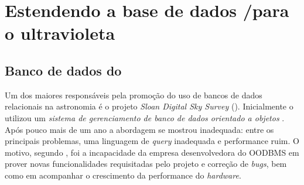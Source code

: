 


\chapter{Estendendo a base de dados \SDSS/\STARLIGHT para o ultravioleta}
\label{sec:Crossmatch}



\section{Banco de dados do \SDSS}

Um dos maiores responsáveis pela promoção do uso de bancos de dados relacionais
na astronomia é o projeto {\em Sloan Digital Sky Survey} (\SDSS). Inicialmente o
\SDSS utilizou um {\em sistema de gerenciamento de banco de dados orientado a
objetos} \citep[OODBMS;][]{Maier1986}. Após pouco mais de um ano a abordagem se
mostrou inadequada: entre os principais problemas, uma linguagem de {\em query}
inadequada e performance ruim. O motivo, segundo \citet{Thakar2004}, foi a
incapacidade da empresa desenvolvedora do OODBMS em prover novas funcionalidades
requisitadas pelo projeto e correção de {\em bugs}, bem como em acompanhar o
crescimento da performance do {\em hardware}.

